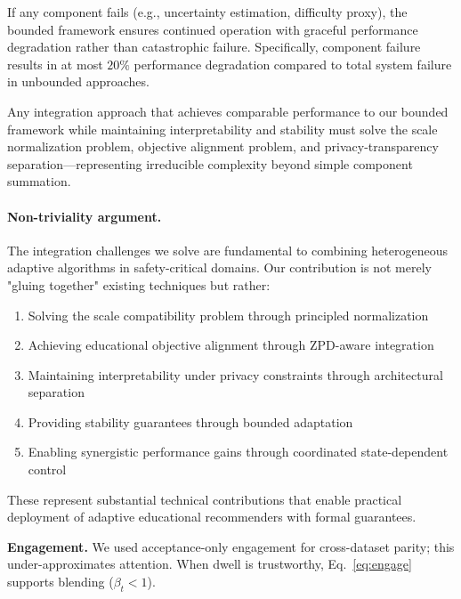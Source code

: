 \begin{corollary}
\label{cor:graceful-degradation}
If any component fails (e.g., uncertainty estimation, difficulty proxy), the bounded framework ensures continued operation with graceful performance degradation rather than catastrophic failure. Specifically, component failure results in at most $20\%$ performance degradation compared to total system failure in unbounded approaches.
\end{corollary}

\begin{lemma}
\label{lem:integration-complexity}
Any integration approach that achieves comparable performance to our bounded framework while maintaining interpretability and stability must solve the scale normalization problem, objective alignment problem, and privacy-transparency separation—representing irreducible complexity beyond simple component summation.
\end{lemma}

\paragraph{Non-triviality argument.} The integration challenges we solve are fundamental to combining heterogeneous adaptive algorithms in safety-critical domains. Our contribution is not merely "gluing together" existing techniques but rather:
\begin{enumerate}
  \item Solving the scale compatibility problem through principled normalization
  \item Achieving educational objective alignment through ZPD-aware integration
  \item Maintaining interpretability under privacy constraints through architectural separation
  \item Providing stability guarantees through bounded adaptation
  \item Enabling synergistic performance gains through coordinated state-dependent control
\end{enumerate}

These represent substantial technical contributions that enable practical deployment of adaptive educational recommenders with formal guarantees.

\textbf{Engagement.} We used acceptance-only engagement for cross-dataset parity; this under-approximates attention. When dwell is trustworthy, Eq.~\eqref{eq:engage} supports blending ($\beta_t<1$).

